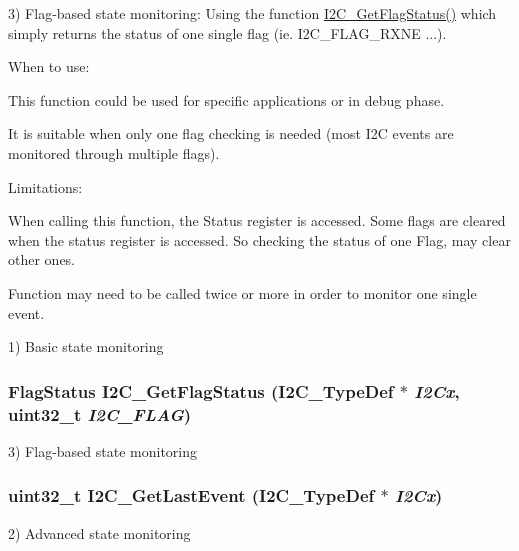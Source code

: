 3) Flag-\/based state monitoring: Using the function \hyperlink{group__I2C__Exported__Functions_ga15c95d0ed124f029621a2061b1677ee7}{I2C\_\-GetFlagStatus()} which simply returns the status of one single flag (ie. I2C\_\-FLAG\_\-RXNE ...).
\begin{DoxyItemize}
\item When to use:
\begin{DoxyItemize}
\item This function could be used for specific applications or in debug phase.
\item It is suitable when only one flag checking is needed (most I2C events are monitored through multiple flags).
\end{DoxyItemize}
\item Limitations:
\begin{DoxyItemize}
\item When calling this function, the Status register is accessed. Some flags are cleared when the status register is accessed. So checking the status of one Flag, may clear other ones.
\item Function may need to be called twice or more in order to monitor one single event.
\end{DoxyItemize}
\end{DoxyItemize}

1) Basic state monitoring \hypertarget{group__I2C__Exported__Functions_ga15c95d0ed124f029621a2061b1677ee7}{
\subsubsection[{I2C\_\-GetFlagStatus}]{\setlength{\rightskip}{0pt plus 5cm}FlagStatus I2C\_\-GetFlagStatus (I2C\_\-TypeDef $\ast$ {\em I2Cx}, \/  uint32\_\-t {\em I2C\_\-FLAG})}}
\label{group__I2C__Exported__Functions_ga15c95d0ed124f029621a2061b1677ee7}
3) Flag-\/based state monitoring \hypertarget{group__I2C__Exported__Functions_ga29237aea9b5a3ead33167e1d027e9f1a}{
\subsubsection[{I2C\_\-GetLastEvent}]{\setlength{\rightskip}{0pt plus 5cm}uint32\_\-t I2C\_\-GetLastEvent (I2C\_\-TypeDef $\ast$ {\em I2Cx})}}
\label{group__I2C__Exported__Functions_ga29237aea9b5a3ead33167e1d027e9f1a}
2) Advanced state monitoring 